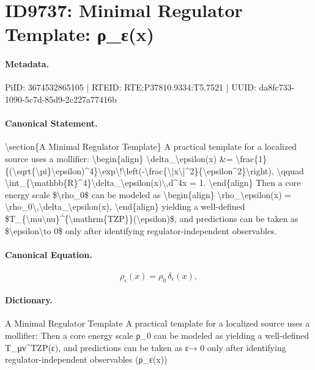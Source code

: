 \section*{ID9737: Minimal Regulator Template: ρ\_ε(x)}
\paragraph{Metadata.}
PiID: 3674532865105 | RTEID: RTE:P37810.9334:T5.7521 | UUID: da8fc733-1090-5c7d-85d9-2c227a77416b

\paragraph{Canonical Statement.}
\textbackslash{}section\{A Minimal Regulator Template\} A practical template for a localized source uses a mollifier: \textbackslash{}begin\{align\} \textbackslash{}delta\_\textbackslash{}epsilon(x) \&= \textbackslash{}frac\{1\}\{(\textbackslash{}sqrt\{\textbackslash{}pi\}\textbackslash{}epsilon)\textasciicircum{}4\}\textbackslash{}exp\textbackslash{}!\textbackslash{}left(-\textbackslash{}frac\{\textbackslash{}|x\textbackslash{}|\textasciicircum{}2\}\{\textbackslash{}epsilon\textasciicircum{}2\}\textbackslash{}right), \textbackslash{}qquad \textbackslash{}int\_\{\textbackslash{}mathbb\{R\}\textasciicircum{}4\}\textbackslash{}delta\_\textbackslash{}epsilon(x)\textbackslash{},d\textasciicircum{}4x = 1. \textbackslash{}end\{align\} Then a core energy scale \$\textbackslash{}rho\_0\$ can be modeled as \textbackslash{}begin\{align\} \textbackslash{}rho\_\textbackslash{}epsilon(x) = \textbackslash{}rho\_0\textbackslash{},\textbackslash{}delta\_\textbackslash{}epsilon(x), \textbackslash{}end\{align\} yielding a well-defined \$T\_\{\textbackslash{}mu\textbackslash{}nu\}\textasciicircum{}\{\textbackslash{}mathrm\{TZP\}\}(\textbackslash{}epsilon)\$, and predictions can be taken as \$\textbackslash{}epsilon\textbackslash{}to 0\$ only after identifying regulator-independent observables.

\paragraph{Canonical Equation.}
\[
\rho_\epsilon(x) = \rho_0\,\delta_\epsilon(x),
\]

\paragraph{Dictionary.}
A Minimal Regulator Template A practical template for a localized source uses a mollifier: Then a core energy scale ρ\_0 can be modeled as yielding a well-defined T\_μν\textasciicircum{}TZP(ε), and predictions can be taken as ε→ 0 only after identifying regulator-independent observables (ρ\_ε(x))

